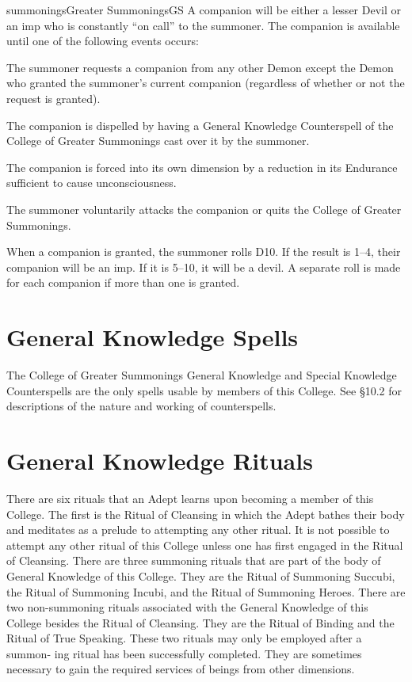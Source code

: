 \begin{College}[1.0]{summonings}{Greater Summonings}{GS}
A companion will be either a lesser Devil or an imp who is constantly
“on call” to the summoner.  The companion is available until one of
the following events occurs:

\begin{Enumerate}
\item The summoner requests a companion from any other Demon except
  the Demon who granted the summoner’s current companion (regardless
  of whether or not the request is granted).
\item The companion is dispelled by having a General Knowledge
  Counterspell of the College of Greater Summonings cast over it by
  the summoner.
\item The companion is forced into its own dimension by a reduction in
  its Endurance sufficient to cause unconsciousness.
\item The summoner voluntarily attacks the companion or quits the
  College of Greater Summonings.
\end{Enumerate}

When a companion is granted, the summoner rolls D10.  If the result is
1--4, their companion will be an imp. If it is 5--10, it will be a
devil. A separate roll is made for each companion if more than one is
granted.

\section{General Knowledge Spells}

The College of Greater Summonings General Knowledge and Special
Knowledge Counterspells are the only spells usable by members of this
College.  See §10.2 for descriptions of the nature and working of
counterspells.

\section{General Knowledge Rituals}

There are six rituals that an Adept learns upon becoming a member of
this College. The first is the Ritual of Cleansing in which the Adept
bathes their body and meditates as a prelude to attempting any other
ritual.  It is not possible to attempt any other ritual of this
College unless one has first engaged in the Ritual of Cleansing.
There are three summoning rituals that are part of the body of General
Knowledge of this College. They are the Ritual of Summoning Succubi,
the Ritual of Summoning Incubi, and the Ritual of Summoning Heroes.
There are two non-summoning rituals associated with the General
Knowledge of this College besides the Ritual of Cleansing.  They are
the Ritual of Binding and the Ritual of True Speaking. These two
rituals may only be employed after a summon- ing ritual has been
successfully completed.  They are sometimes necessary to gain the
required services of beings from other dimensions.


\end{College}
